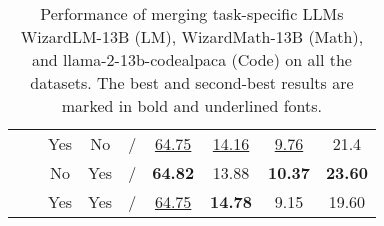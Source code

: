 \begin{table*}[h!]
{\begin{tabular}{c c c c c c c c c}
                                                                           &             & Yes & No & / & \underline{64.75} & \underline{14.16}& \underline{9.76} & 21.4 \\  
                                                                           &             & No & Yes & /& \textbf{64.82}& 13.88& \textbf{10.37}& \textbf{23.60}\\   
                                                                           &             & Yes& Yes& /& \underline{64.75}& \textbf{14.78}& 9.15& 19.60\\ \bottomrule
\end{tabular}}
\caption{\label{table:sft_models_merging_results} Performance of merging task-specific LLMs WizardLM-13B (LM), WizardMath-13B (Math), and llama-2-13b-codealpaca (Code) on all the datasets. The best and second-best results are marked in bold and underlined fonts.}
\end{table*}
